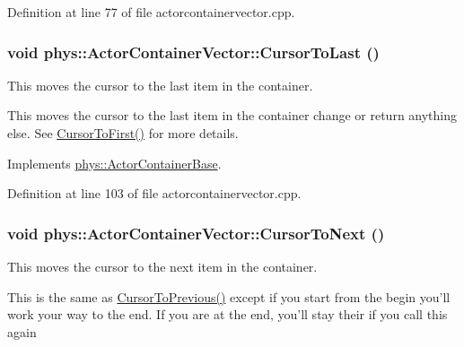 Definition at line 77 of file actorcontainervector.cpp.

\hypertarget{classphys_1_1ActorContainerVector_aa6b08266bbb57a22c07ab50514e58db4}{
\subsubsection[{CursorToLast}]{\setlength{\rightskip}{0pt plus 5cm}void phys::ActorContainerVector::CursorToLast ()}}
\label{d3/d64/classphys_1_1ActorContainerVector_aa6b08266bbb57a22c07ab50514e58db4}


This moves the cursor to the last item in the container. 

This moves the cursor to the last item in the container change or return anything else. See \hyperlink{classphys_1_1ActorContainerVector_ad9c2eb2a9405dcf687c86745afc9c031}{CursorToFirst()} for more details. 

Implements \hyperlink{classphys_1_1ActorContainerBase_afad072e018a04c190e5e5fb93b82b354}{phys::ActorContainerBase}.



Definition at line 103 of file actorcontainervector.cpp.

\hypertarget{classphys_1_1ActorContainerVector_a1c72366a6261d8e98dc0a9d2fad9f70f}{
\subsubsection[{CursorToNext}]{\setlength{\rightskip}{0pt plus 5cm}void phys::ActorContainerVector::CursorToNext ()}}
\label{d3/d64/classphys_1_1ActorContainerVector_a1c72366a6261d8e98dc0a9d2fad9f70f}


This moves the cursor to the next item in the container. 

This is the same as \hyperlink{classphys_1_1ActorContainerVector_ac483bcdf348f55dc8b04a8805a002413}{CursorToPrevious()} except if you start from the begin you'll work your way to the end. If you are at the end, you'll stay their if you call this again 

